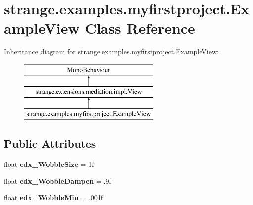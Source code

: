 \hypertarget{classstrange_1_1examples_1_1myfirstproject_1_1_example_view}{\section{strange.\-examples.\-myfirstproject.\-Example\-View Class Reference}
\label{classstrange_1_1examples_1_1myfirstproject_1_1_example_view}
}
Inheritance diagram for strange.\-examples.\-myfirstproject.\-Example\-View\-:\begin{figure}[H]
\begin{center}
\leavevmode
\includegraphics[height=3.000000cm]{classstrange_1_1examples_1_1myfirstproject_1_1_example_view}
\end{center}
\end{figure}
\subsection*{Public Attributes}
\begin{DoxyCompactItemize}
\item 
\hypertarget{classstrange_1_1examples_1_1myfirstproject_1_1_example_view_ac06f4766d1aace6c4e282afb3b3b0b05}{float {\bfseries edx\-\_\-\-Wobble\-Size} = 1f}\label{classstrange_1_1examples_1_1myfirstproject_1_1_example_view_ac06f4766d1aace6c4e282afb3b3b0b05}

\item 
\hypertarget{classstrange_1_1examples_1_1myfirstproject_1_1_example_view_a9f6d25d073991c0a1f70c20c31b3f2b6}{float {\bfseries edx\-\_\-\-Wobble\-Dampen} = .\-9f}\label{classstrange_1_1examples_1_1myfirstproject_1_1_example_view_a9f6d25d073991c0a1f70c20c31b3f2b6}

\item 
\hypertarget{classstrange_1_1examples_1_1myfirstproject_1_1_example_view_a33ac9eb33918719d553b565e0b0f050c}{float {\bfseries edx\-\_\-\-Wobble\-Min} = .\-001f}\label{classstrange_1_1examples_1_1myfirstproject_1_1_example_view_a33ac9eb33918719d553b565e0b0f050c}

\end{DoxyCompactItemize}
